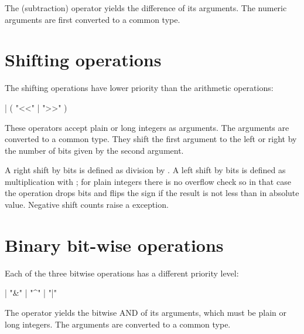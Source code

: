 The \code{-} (subtraction) operator yields the difference of its
arguments.  The numeric arguments are first converted to a common
type.


\section{Shifting operations\label{shifting}}

The shifting operations have lower priority than the arithmetic
operations:

\begin{productionlist}
             {
              |  ( "<<" | ">>" ) }
\end{productionlist}

These operators accept plain or long integers as arguments.  The
arguments are converted to a common type.  They shift the first
argument to the left or right by the number of bits given by the
second argument.

A right shift by  bits is defined as division by
.  A left shift by  bits is defined as
multiplication with ; for plain integers there is
no overflow check so in that case the operation drops bits and flips
the sign if the result is not less than  in absolute
value.  Negative shift counts raise a 
exception.


\section{Binary bit-wise operations\label{bitwise}}

Each of the three bitwise operations has a different priority level:

\begin{productionlist}
             { |  "\&" }
             { |  "\textasciicircum" }
             { |  "|" }
\end{productionlist}

The \code{\&} operator yields the bitwise AND of its arguments, which
must be plain or long integers.  The arguments are converted to a
common type.

